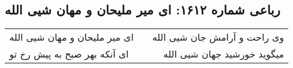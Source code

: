\begin{center}
\section*{رباعی شماره ۱۶۱۲: ای میر ملیحان و مهان شیی الله}
\label{sec:1612}
\begin{longtable}{l p{0.5cm} r}
ای میر ملیحان و مهان شیی الله
&&
وی راحت و آرامش جان شیی الله
\\
ای آنکه بهر صبح به پیش رخ تو
&&
میگوید خورشید جهان شیی الله
\\
\end{longtable}
\end{center}

